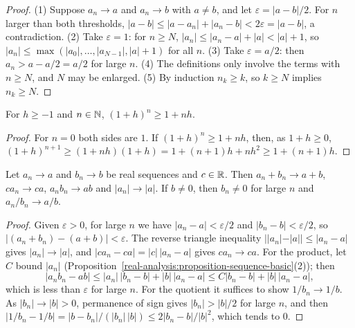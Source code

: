 \begin{proof}
(1) Suppose $a_n \to a$ and $a_n \to b$ with $a \neq b$, and let $\varepsilon = |a - b|/2$. For $n$ larger than both thresholds, $|a - b| \leq |a - a_n| + |a_n - b| < 2\varepsilon = |a - b|$, a contradiction.
(2) Take $\varepsilon = 1$: for $n \geq N$, $|a_n| \leq |a_n - a| + |a| < |a| + 1$, so $|a_n| \leq \max(|a_0|, \ldots, |a_{N-1}|, |a| + 1)$ for all $n$. (3) Take $\varepsilon = a/2$: then
$a_n > a - a/2 = a/2$ for large $n$. (4) The definitions only involve the terms with $n \geq N$, and $N$ may be enlarged. (5) By induction $n_k \geq k$, so $k \geq N$ implies $n_k \geq N$.
\end{proof}

\begin{lemma}\label{real-analysis:lemma-bernoulli}
For $h \geq -1$ and $n \in \mathbb{N}$, $(1 + h)^n \geq 1 + nh$.
\end{lemma}

\begin{proof}
For $n = 0$ both sides are $1$. If $(1 + h)^n \geq 1 + nh$, then, as $1 + h \geq 0$, $(1 + h)^{n+1} \geq (1 + nh)(1 + h) = 1 + (n + 1)h + nh^2 \geq 1 + (n + 1)h$.
\end{proof}

\begin{proposition}\label{real-analysis:proposition-algebra-limits}
Let $a_n \to a$ and $b_n \to b$ be real sequences and $c \in \mathbb{R}$. Then $a_n + b_n \to a + b$, $ca_n \to ca$, $a_nb_n \to ab$ and $|a_n| \to |a|$. If $b \neq 0$, then $b_n \neq 0$ for large $n$ and
$a_n/b_n \to a/b$.
\end{proposition}

\begin{proof}
Given $\varepsilon > 0$, for large $n$ we have $|a_n - a| < \varepsilon/2$ and $|b_n - b| < \varepsilon/2$, so $|(a_n + b_n) - (a + b)| < \varepsilon$. The reverse triangle inequality
$||a_n| - |a|| \leq |a_n - a|$ gives $|a_n| \to |a|$, and $|ca_n - ca| = |c|\,|a_n - a|$ gives $ca_n \to ca$. For the product, let $C$ bound $|a_n|$
(Proposition~\ref{real-analysis:proposition-sequence-basic}(2)); then
\[
|a_nb_n - ab| \leq |a_n|\,|b_n - b| + |b|\,|a_n - a| \leq C|b_n - b| + |b|\,|a_n - a|,
\]
which is less than $\varepsilon$ for large $n$. For the quotient it suffices to show $1/b_n \to 1/b$. As $|b_n| \to |b| > 0$, permanence of sign gives $|b_n| > |b|/2$ for large $n$, and then
$|1/b_n - 1/b| = |b - b_n|/(|b_n|\,|b|) \leq 2|b_n - b|/|b|^2$, which tends to $0$.
\end{proof}

